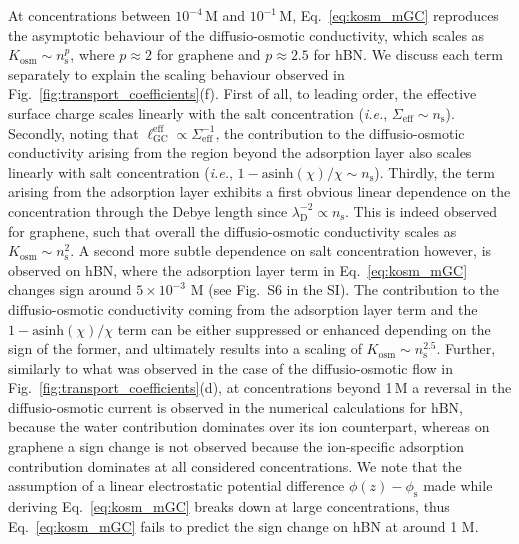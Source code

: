 \documentclass[journal=ancac3,manuscript=article,layout=twocolumn]{achemso}
\newcommand{\lGC}{\ell_\text{GC}}
\newcommand{\phis}{\phi_\text{s}}
\newcommand{\ns}{n_\text{s}}
\begin{document}
At concentrations between $10^{-4}$\,M and $10^{-1}$\,M,
 Eq.~\eqref{eq:kosm_mGC} reproduces
 the asymptotic
 behaviour of the diffusio-osmotic conductivity,
 which scales as $K_\mathrm{osm} \sim n_\mathrm s ^{p}$,
 where $p\approx 2$ for graphene and
 $p\approx 2.5$ for hBN.
 We discuss each term separately to explain
 the scaling behaviour observed in
 Fig.~\ref{fig:transport_coefficients}(f).
First of all, to leading order, the effective surface charge
scales linearly with the salt concentration
(\textit{i.e.}, $\Sigma_\mathrm{eff}\sim n_\mathrm{s}$). Secondly,
noting that $\lGC^\text{eff} \propto \Sigma_\mathrm{eff}^{-1}$,
the contribution to the diffusio-osmotic
conductivity arising from the region beyond
 the adsorption layer
 also scales linearly with salt concentration
 (\textit{i.e.}, $1-\text{asinh} (\chi)/\chi \sim n_\mathrm{s}$).
Thirdly, the term arising from the
 adsorption layer exhibits
 a first obvious linear dependence on the
 concentration through the Debye length
 since $\lambda_\mathrm{D}^{-2} \propto n_\mathrm{s}$. This is indeed
 observed for graphene,
 such that overall the diffusio-osmotic
 conductivity scales as $K_\mathrm{osm} \sim n_\mathrm s ^{2}$.
 A second more subtle dependence on salt concentration however, is observed on hBN,
 where the adsorption layer term in  Eq.~\eqref{eq:kosm_mGC} changes sign
around $5\times 10^{-3}$ M (see Fig.~S6 in the SI).
The contribution  to  the diffusio-osmotic conductivity coming from the adsorption layer
term and the $1-\text{asinh} (\chi)/\chi$
term can be either  suppressed or enhanced
depending on the sign of the former, and ultimately results into a scaling of
$K_\mathrm{osm} \sim \ns^{2.5}$.
%
Further, similarly to what was observed in the case of the diffusio-osmotic
flow in Fig.~\ref{fig:transport_coefficients}(d),
at concentrations beyond 1\,M a reversal in the
diffusio-osmotic current is  observed in the
numerical calculations for hBN, because the water
contribution dominates over
its ion counterpart, whereas on graphene a sign change is
not observed because the ion-specific adsorption
contribution dominates at
all considered concentrations.
We note that the assumption of a linear
electrostatic potential difference $\phi(z) -\phis$
made while deriving Eq.~\eqref{eq:kosm_mGC} breaks down
at large concentrations, thus Eq.~\eqref{eq:kosm_mGC}
fails to predict the sign change on hBN at around 1 M.
\end{document}
